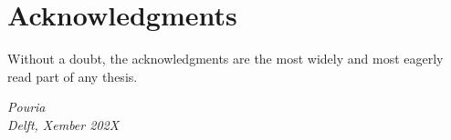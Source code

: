 \chapter*{Acknowledgments}

Without a doubt, the acknowledgments are the most widely and most
eagerly read part of any thesis.

\begin{flushright}
{\makeatletter\itshape
    Pouria \\
    Delft, Xember 202X
\makeatother}
\end{flushright}


